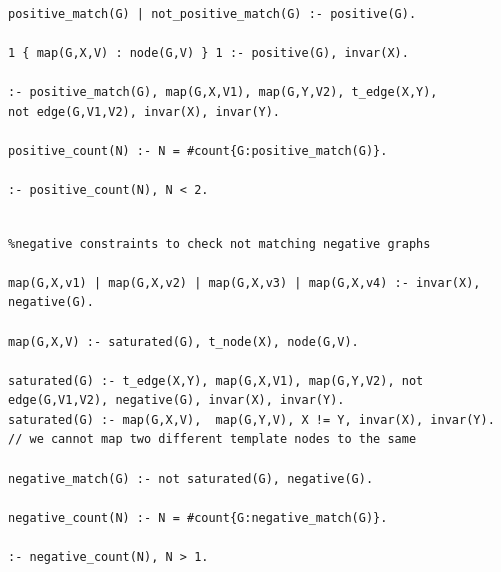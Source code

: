 \lstset{basicstyle=\footnotesize\ttfamily,breaklines=true}
\begin{lstlisting}[caption=ASP positive matching, style=model]
positive_match(G) | not_positive_match(G) :- positive(G).

1 { map(G,X,V) : node(G,V) } 1 :- positive(G), invar(X).

:- positive_match(G), map(G,X,V1), map(G,Y,V2), t_edge(X,Y), 
not edge(G,V1,V2), invar(X), invar(Y).

positive_count(N) :- N = #count{G:positive_match(G)}.

:- positive_count(N), N < 2.
\end{lstlisting}

\begin{lstlisting}[caption=ASP negative matching, style=model]
%Saturated Representation

%negative constraints to check not matching negative graphs

map(G,X,v1) | map(G,X,v2) | map(G,X,v3) | map(G,X,v4) :- invar(X), negative(G).

map(G,X,V) :- saturated(G), t_node(X), node(G,V).

saturated(G) :- t_edge(X,Y), map(G,X,V1), map(G,Y,V2), not edge(G,V1,V2), negative(G), invar(X), invar(Y).
saturated(G) :- map(G,X,V),  map(G,Y,V), X != Y, invar(X), invar(Y). // we cannot map two different template nodes to the same 

negative_match(G) :- not saturated(G), negative(G).

negative_count(N) :- N = #count{G:negative_match(G)}.

:- negative_count(N), N > 1.

\end{lstlisting}



